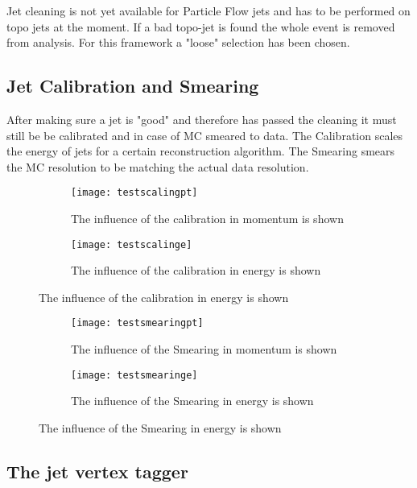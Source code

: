 Jet cleaning is not yet available for Particle Flow jets and has to be performed on topo jets at the moment. If a bad topo-jet is found the whole event is removed from analysis.
For this framework a "loose" selection has been chosen.

\subsection{Jet Calibration and Smearing}

After making sure a jet is "good" and therefore has passed the cleaning it must still be be calibrated and in case of MC smeared to data. The Calibration scales the energy of jets for a certain reconstruction algorithm. The Smearing smears the MC resolution to be matching the actual data resolution.


\begin{figure}
\centering
\begin{subfigure}[b]{0.5\figwidth}
\texttt{[image: testscalingpt]}
\caption[Influence of the JES on the transversal momentum]{The influence of the calibration in momentum is shown}
\label{fig:testscalingpt}
\end{subfigure}
\quad
\begin{subfigure}[b]{0.5\figwidth}
\texttt{[image: testscalinge]}
\caption[Influence of the JES on the energy]{The influence of the calibration in energy is shown}
\label{fig:testscalinge}
\end{subfigure}
\end{figure}


\begin{figure}
\centering
\begin{subfigure}[b]{0.5\figwidth}
\texttt{[image: testsmearingpt]}
\caption[Influence of the Smearing on the transversal momentum]{The influence of the Smearing in momentum is shown}
\label{fig:testsmearingpt}
\end{subfigure}
\quad
\begin{subfigure}[b]{0.5\figwidth}
\texttt{[image: testsmearinge]}
\caption[Influence of the Smearing on the energy]{The influence of the Smearing in energy is shown}
\label{fig:testsmearinge}
\end{subfigure}
\end{figure}


\subsection{The jet vertex tagger}

